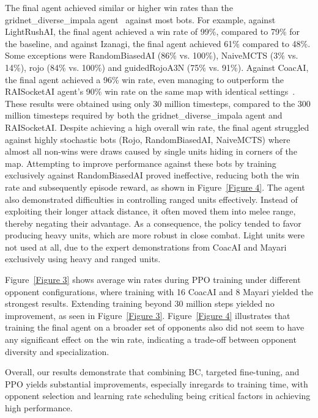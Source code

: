 \documentclass[10pt,twocolumn,letterpaper]{article}
\begin{document}
The final agent achieved similar or higher win rates than the gridnet\_diverse\_impala agent~\cite{huang2021gym} against most bots. For example, against LightRushAI, the final agent achieved a win rate of 99\%, compared to 79\% for the baseline, and against Izanagi, the final agent achieved 61\% compared to 48\%. Some exceptions were RandomBiasedAI (86\% vs. 100\%), NaiveMCTS (3\% vs. 14\%), rojo (84\% vs. 100\%) and guidedRojoA3N (75\% vs. 91\%). Against CoacAI, the final agent achieved a 96\% win rate, even managing to outperform the RAISocketAI agent’s 90\% win rate on the same map with identical settings~\cite{goodfriend2024raisocketai}. These results were obtained using only 30 million timesteps, compared to the 300 million timesteps required by both the gridnet\_diverse\_impala agent and RAISocketAI.
Despite achieving a high overall win rate, the final agent struggled against highly stochastic bots (Rojo, RandomBiasedAI, NaiveMCTS) where almost all non-wins were draws caused by single units hiding in corners of the map. Attempting to improve performance against these bots by training exclusively against RandomBiasedAI proved ineffective, reducing both the win rate and subsequently episode reward, as shown in Figure~\ref{Figure 4}. 
The agent also demonstrated difficulties in controlling ranged units effectively. Instead of exploiting their longer attack distance, it often moved them into melee range, thereby negating their advantage. As a consequence, the policy tended to favor producing heavy units, which are more robust in close combat. Light units were not used at all, due to the expert demonstrations from CoacAI and Mayari exclusively using heavy and ranged units.

Figure~\ref{Figure 3} shows average win rates during PPO training under different opponent configurations, where training with 16 CoacAI and 8 Mayari yielded the strongest results. 
Extending training beyond 30 million steps yielded no improvement, as seen in Figure~\ref{Figure 3}. Figure~\ref{Figure 4} illustrates that training the final agent on a broader set of opponents also did not  seem to have any significant effect on the win rate, indicating a trade-off between opponent diversity and specialization.

Overall, our results demonstrate that combining BC, targeted fine-tuning, and PPO yields substantial improvements, especially inregards to training time, with opponent selection and learning rate scheduling being critical factors in achieving high performance.
\end{document}

